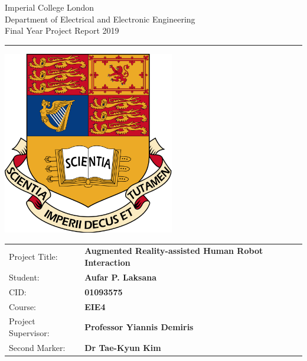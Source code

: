 \begin{titlepage}
	\setlength{\parindent}{0pt}
	\setlength{\parskip}{0pt}
	
	{
		\Large
		\raggedright
		Imperial College London\\[17pt]
		Department of Electrical and Electronic Engineering\\[17pt]
		Final Year Project Report 2019\\[17pt]
		
	}
	
	\rule{\columnwidth}{3pt}
	\vfill
	\centering
	\includegraphics[width=0.7\columnwidth,height=80mm,keepaspectratio]{img/crest.png}
	\vfill
	\setlength{\tabcolsep}{0pt}
	
	\begin{tabular}{p{40mm}p{\dimexpr\columnwidth-40mm}}
		Project Title: & \textbf{Augmented Reality-assisted Human Robot Interaction} \\[12pt]
		Student: & \textbf{Aufar P. Laksana} \\[12pt]
		CID: & \textbf{01093575} \\[12pt]
		Course: & \textbf{EIE4} \\[12pt]
		Project Supervisor: & \textbf{Professor Yiannis Demiris} \\[12pt]
		Second Marker: & \textbf{Dr Tae-Kyun Kim} \\
	\end{tabular}
\end{titlepage}